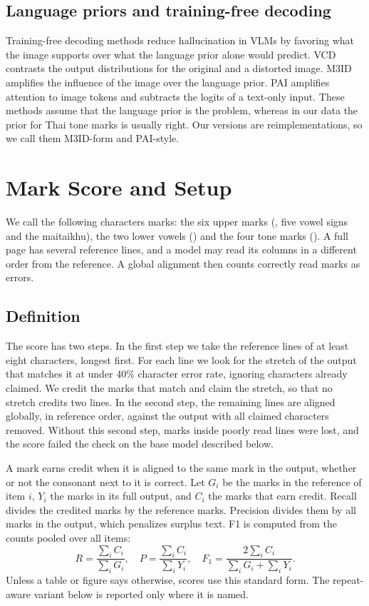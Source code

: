 \subsection{Language priors and training-free decoding}
Training-free decoding methods reduce hallucination in VLMs by favoring what the image supports over what the language prior alone would predict. VCD \cite{leng2024vcd} contrasts the output distributions for the original and a distorted image. M3ID \cite{favero2024m3id} amplifies the influence of the image over the language prior. PAI \cite{liu2024pai} amplifies attention to image tokens and subtracts the logits of a text-only input. These methods assume that the language prior is the problem, whereas in our data the prior for Thai tone marks is usually right. Our versions are reimplementations, so we call them M3ID-form and PAI-style.

\section{Mark Score and Setup}\label{sec:metric}\label{sec:setup}
We call the following characters marks: the six upper marks (, five vowel signs and the maitaikhu), the two lower vowels () and the four tone marks (). A full page has several reference lines, and a model may read its columns in a different order from the reference. A global alignment then counts correctly read marks as errors.

\subsection{Definition}
The score has two steps. In the first step we take the reference lines of at least eight characters, longest first. For each line we look for the stretch of the output that matches it at under 40\% character error rate, ignoring characters already claimed. We credit the marks that match and claim the stretch, so that no stretch credits two lines. In the second step, the remaining lines are aligned globally, in reference order, against the output with all claimed characters removed. Without this second step, marks inside poorly read lines were lost, and the score failed the check on the base model described below.

A mark earns credit when it is aligned to the same mark in the output, whether or not the consonant next to it is correct. Let $G_i$ be the marks in the reference of item $i$, $Y_i$ the marks in its full output, and $C_i$ the marks that earn credit. Recall divides the credited marks by the reference marks. Precision divides them by all marks in the output, which penalizes surplus text. F1 is computed from the counts pooled over all items:
\begin{equation}
R=\frac{\sum_i C_i}{\sum_i G_i},\quad
P=\frac{\sum_i C_i}{\sum_i Y_i},\quad
F_1=\frac{2\sum_i C_i}{\sum_i G_i+\sum_i Y_i}.
\end{equation}
Unless a table or figure says otherwise, scores use this standard form. The repeat-aware variant below is reported only where it is named.

